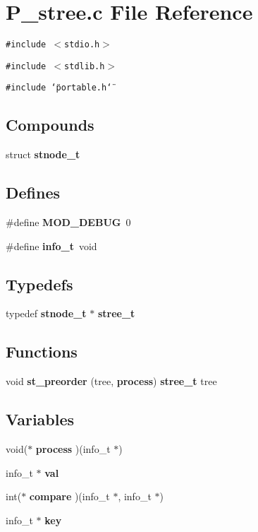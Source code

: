\section{P\_\-stree.c File Reference}
\label{P__stree_8c}
{\tt \#include $<$stdio.h$>$}\par
{\tt \#include $<$stdlib.h$>$}\par
{\tt \#include \char`\"{}portable.h\char`\"{}}\par
\subsection*{Compounds}
\begin{CompactItemize}
\item 
struct {\bf stnode\_\-t}
\end{CompactItemize}
\subsection*{Defines}
\begin{CompactItemize}
\item 
\#define {\bf MOD\_\-DEBUG}\ 0
\item 
\#define {\bf info\_\-t}\ void
\end{CompactItemize}
\subsection*{Typedefs}
\begin{CompactItemize}
\item 
typedef {\bf stnode\_\-t} $\ast$ {\bf stree\_\-t}
\end{CompactItemize}
\subsection*{Functions}
\begin{CompactItemize}
\item 
void {\bf st\_\-preorder} (tree, {\bf process}) {\bf stree\_\-t} tree
\end{CompactItemize}
\subsection*{Variables}
\begin{CompactItemize}
\item 
void($\ast$ {\bf process} )(info\_\-t $\ast$)
\item 
info\_\-t $\ast$ {\bf val}
\item 
int($\ast$ {\bf compare} )(info\_\-t $\ast$, info\_\-t $\ast$)
\item 
info\_\-t $\ast$ {\bf key}
\end{CompactItemize}


